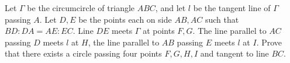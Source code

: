 Let $ \Gamma $ be the circumcircle of triangle $ABC$, and let $l$ be the tangent line of $\Gamma $ passing $A$. Let $ D, E $ be the points each on side $AB, AC$ such that $ BD : DA= AE : EC $. Line $ DE $ meets $\Gamma $ at points $ F, G $. The line parallel to $AC$ passing $ D $ meets $l$ at $H$, the line parallel to $AB$ passing $E$ meets $l$ at $I$. Prove that there exists a circle passing four points $ F, G, H, I $ and tangent to line $ BC$.